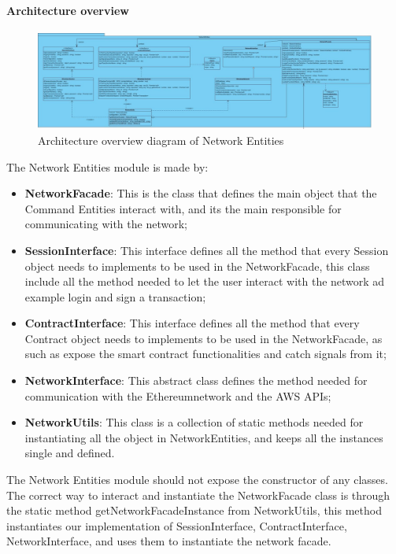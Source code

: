 \paragraph{Architecture overview}
\begin{figure}[h]
	\centering
	\includegraphics[width=\textwidth]{./res/img/networkEntities.jpeg}
	\caption{Architecture overview diagram of Network Entities}
\end{figure}
The Network Entities module is made by:
\begin{itemize}
    \item \textbf{NetworkFacade}: This is the class that defines the main object that the Command Entities interact with, and its the main responsible for communicating with the network;
    \item \textbf{SessionInterface}: This interface defines all the method that every Session object needs to implements to be used in the NetworkFacade, this class include all the method needed to let the user interact with the network ad example login and sign a transaction;
    \item \textbf{ContractInterface}: This interface defines all the method that every Contract object needs to implements to be used in the NetworkFacade, as such as expose the smart contract functionalities and catch signals from it;
    \item \textbf{NetworkInterface}: This abstract class defines the method needed for communication with the Ethereum\glo network and the AWS APIs;
    \item \textbf{NetworkUtils}: This class is a collection of static methods needed for instantiating all the object in NetworkEntities, and keeps all the instances single and defined.
\end{itemize}
The Network Entities module should not expose the constructor of any classes.
The correct way to interact and instantiate the NetworkFacade class is through the static method getNetworkFacadeInstance from NetworkUtils,
this method instantiates our implementation of SessionInterface, ContractInterface, NetworkInterface, and uses them to instantiate the network facade.
